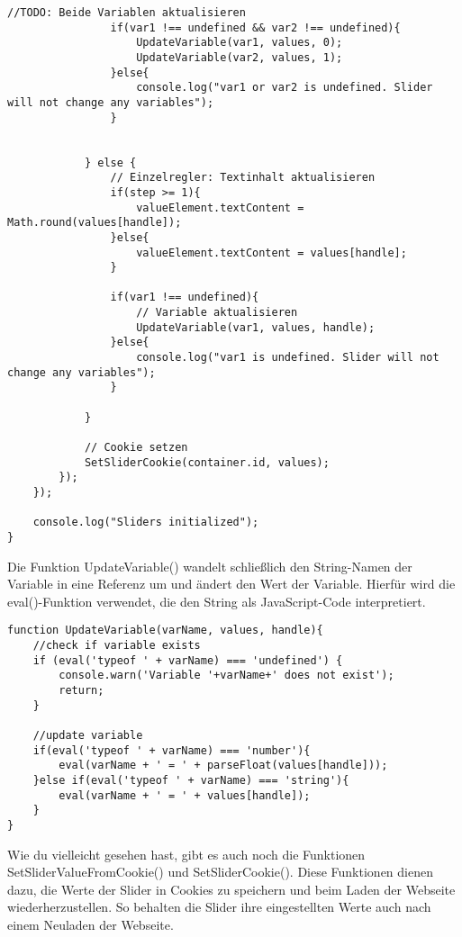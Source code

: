\begin{lstlisting}[style=JavaScript]
                //TODO: Beide Variablen aktualisieren
                if(var1 !== undefined && var2 !== undefined){
                    UpdateVariable(var1, values, 0);
                    UpdateVariable(var2, values, 1);
                }else{
                    console.log("var1 or var2 is undefined. Slider will not change any variables");
                }


            } else {
                // Einzelregler: Textinhalt aktualisieren
                if(step >= 1){
                    valueElement.textContent = Math.round(values[handle]);
                }else{
                    valueElement.textContent = values[handle];
                }

                if(var1 !== undefined){
                    // Variable aktualisieren
                    UpdateVariable(var1, values, handle);
                }else{
                    console.log("var1 is undefined. Slider will not change any variables");
                }

            }

            // Cookie setzen
            SetSliderCookie(container.id, values);
        });
    });

    console.log("Sliders initialized");
}
\end{lstlisting}

Die Funktion UpdateVariable() wandelt schließlich den String-Namen der Variable in eine Referenz um und ändert den Wert der Variable. Hierfür wird die eval()-Funktion verwendet, die den String als JavaScript-Code interpretiert.

\begin{lstlisting}[style=JavaScript]
function UpdateVariable(varName, values, handle){
    //check if variable exists
    if (eval('typeof ' + varName) === 'undefined') {
        console.warn('Variable '+varName+' does not exist');
        return;
    }

    //update variable
    if(eval('typeof ' + varName) === 'number'){
        eval(varName + ' = ' + parseFloat(values[handle]));
    }else if(eval('typeof ' + varName) === 'string'){
        eval(varName + ' = ' + values[handle]);
    }
}
\end{lstlisting}

Wie du vielleicht gesehen hast, gibt es auch noch die Funktionen SetSliderValueFromCookie() und SetSliderCookie(). Diese Funktionen dienen dazu, die Werte der Slider in Cookies zu speichern und beim Laden der Webseite wiederherzustellen. So behalten die Slider ihre eingestellten Werte auch nach einem Neuladen der Webseite.

